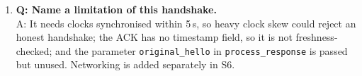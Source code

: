 \documentclass[11pt,a4paper]{report}
\begin{document}
\begin{enumerate}
        A: \texttt{ecdsa\_verify} returns \texttt{False}, and
        \texttt{process\_challenge} (or \texttt{process\_response}) raises
        \texttt{AuthError} --- ``Challenge signature invalid, possible
        impersonation''.
  \item \textbf{Q: Name a limitation of this handshake.}\\
        A: It needs clocks synchronised within 5\,s, so heavy clock skew could
        reject an honest handshake; the ACK has no timestamp field, so it is not
        freshness-checked; and the parameter \texttt{original\_hello} in
        \texttt{process\_response} is passed but unused. Networking is added
        separately in S6.
\end{enumerate}

\end{document}
